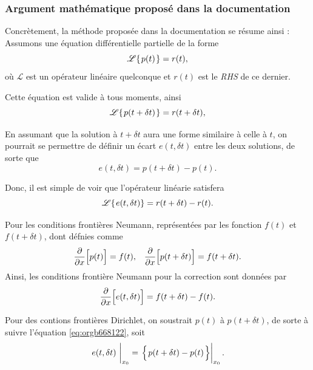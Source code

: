 \documentclass[10pt]{report}
\numberwithin{equation}{section}
\newcommand{\tall}{\vphantom{A^{x^x}_p}}
\newcommand{\pt}{\hspace{1pt}} %
\begin{document}
\subsubsection{Argument mathématique proposé dans la documentation}
\label{sec:org2ab22f5}
Concrètement, la méthode proposée dans la documentation se résume ainsi :
Assumons une équation différentielle partielle de la forme
\begin{equation}
   \mathscr{L}\qty{\pt p(t)\pt} = r(t),
\end{equation}
où \(\mathscr{L}\) est un opérateur linéaire quelconque et \(r(t)\) est le \emph{RHS} de ce dernier.\bigskip

Cette équation est valide à tous moments, ainsi
\begin{equation}
   \mathscr{L}\qty{\pt p(t+\delta t)\pt} = r(t+\delta t),
\end{equation}

En assumant que la solution à \(t+\delta t\) aura une forme similaire à celle à \(t\), on pourrait se permettre de définir un écart \(e(t,\delta t)\) entre les deux solutions, de sorte que
\begin{equation}
\label{eq:orgb668122}
   e(t,\delta t) = p(t+\delta t) - p(t).
\end{equation}

Donc, il est simple de voir que l'opérateur linéarie satisfera
\begin{equation}
   \mathscr{L}\qty{\pt e(t,\delta t)} = r(t+\delta t) - r(t).
\end{equation}

Pour les conditions frontières Neumann, représentées par les fonction \(f(t)\) et \(f(t+\delta t)\), dont défnies comme
\begin{align}
   && \pdv{}{x} \qty[ \tall p(t) ] = f(t), && \pdv{}{x} \qty[\tall p(t+\delta t)] = f(t+\delta t). &&
\end{align}
Ainsi, les conditions frontière Neumann pour la correction sont données par
\begin{equation}
   \pdv{}{x} \qty[ \tall e(t,\delta t) ]  = f(t+\delta t) - f(t).
\end{equation}

Pour des contions frontières Dirichlet, on soustrait \(p(t)\) à \(p(t+\delta t)\), de sorte à suivre l'équation \ref{eq:orgb668122}, soit
\begin{equation}
   \eval{e(t,\delta t)\ }_{x_0} = \eval{ \qty{ \pt p(t+\delta t) - p(t)\pt \tall } }_{x_0}.
\end{equation}
\end{document}
